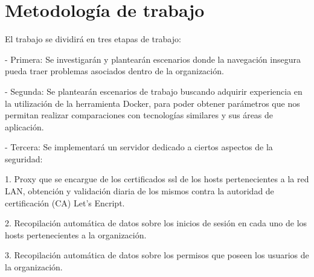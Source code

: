 \section{Metodología de trabajo}
El trabajo se dividirá en tres etapas de trabajo:

-	Primera: Se investigarán y plantearán escenarios donde la navegación insegura pueda traer problemas asociados dentro de la organización. 

-	Segunda: Se plantearán escenarios de trabajo buscando adquirir experiencia en la utilización de la herramienta Docker, para poder obtener parámetros que nos permitan realizar comparaciones con tecnologías similares y sus áreas de aplicación.

-	Tercera: Se implementará un servidor dedicado a ciertos aspectos de la seguridad: 

1.	Proxy que se encargue de los certificados ssl de los hosts pertenecientes a la red LAN, obtención y validación diaria de los mismos contra la autoridad de certificación (CA) Let’s Encript.

2.	Recopilación automática de datos sobre los inicios de sesión en cada uno de los hosts pertenecientes a la organización.

3.	Recopilación automática de datos sobre los permisos que poseen los usuarios de la organización.


